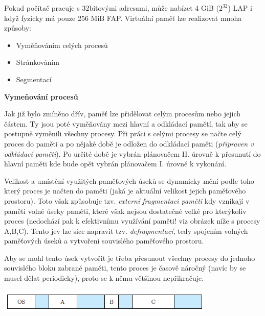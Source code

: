 Pokud počítač pracuje s 32bitovými adresami, může nabízet 4 GiB ($2^{32}$) LAP i když fyzicky má pouze 256 MiB FAP. Virtuální paměť lze realizovat mnoha způsoby:
\begin{itemize}
    \item Vyměňováním celých procesů
    \item Stránkováním
    \item Segmentací
\end{itemize}

\begin{Large}
    \vspace{0,5cm}
    \textbf{Vymeňování procesů}
\end{Large}

Jak již bylo zmíněno dřív, paměť lze přidělovat celým procesům nebo jejich částem. Ty jsou poté vyměňovány mezi hlavní a odkládací pamětí, tak aby se postupně vyměnili všechny procesy. Při práci s celými procesy se načte celý proces do paměti a po nějaké době je odložen do odkládací paměti (\textit{připraven v odkládací paměti}). Po určité době je vybrán plánovačem II. úrovně k přesunutí do hlavní paměti kde bude opět vybrán plánovačem I. úrovně k vykonání. 

\vspace{0,5cm}

Velikost a umístění využitých paměťových úseků se dynamicky mění podle toho který proces je načten do paměti (jaká je aktuální velikost jejich paměťového prostoru). Toto však způsobuje tzv. \textit{externí fragmentaci paměti} kdy vznikají v paměti volné úseky paměti, které však nejsou dostatečné velké pro kterýkoliv proces (nedochází pak k efektivnímu využívání paměti! viz obrázek níže s procesy A,B,C). Tento jev lze sice napravit tzv. \textit{defragmentací}, tedy spojením volných paměťových úseků a vytvoření souvislého paměťového prostoru.

\newpage

Aby se mohl tento úsek vytvořit je třeba přesunout všechny procesy do jednoho souvislého bloku zabrané paměti, tento proces je časově náročný (navíc by se musel dělat periodicky), proto se k němu většinou nepřikračuje. 

\begin{center}
    \includegraphics[scale=1]{images/mem_fragmentace.png}
\end{center}

